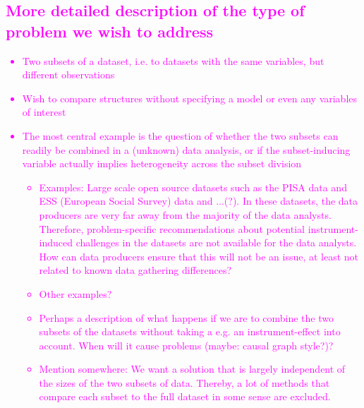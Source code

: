 \documentclass[titlepage,11pt,twoside]{article}
\newcommand{\hl}[1]{\textcolor{magenta}{#1}}
\begin{document}
\subsection{\hl{More detailed description of the type of problem we wish to address}}
\hl{
\begin{itemize}
\item Two subsets of a dataset, i.e. to datasets with the same variables, but different observations
\item Wish to compare structures without specifying a model or even any variables of interest
\item The most central example is the question of whether the two subsets can readily be combined in a (unknown) data analysis, or if the subset-inducing variable actually implies heterogeneity across the subset division
	\begin{itemize}
		\item Examples: Large scale open source datasets such as the PISA data and ESS (European Social Survey) data and ...(?). In these datasets, the data producers are very far away from the majority of the data analysts. Therefore, problem-specific recommendations about potential instrument-induced challenges in the datasets are not available for the data analysts. How can data producers ensure that this will not be an issue, at least not related to known data gathering differences?
		\item Other examples?
		\item Perhaps a description of what happens if we are to combine the two subsets of the datasets without taking a e.g. an instrument-effect into account. When will it cause problems (maybe: causal graph style?)?
		\item Mention somewhere: We want a solution that is largely independent of the sizes of the two subsets of data. Thereby, a lot of methods that compare each subset to the full dataset in some sense are excluded.
	\end{itemize}	
\end{itemize}
}
\end{document}
